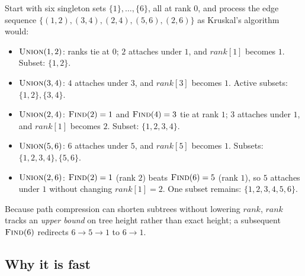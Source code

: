 \begin{algorithm}[H]
\caption{Union-Find with union by rank and path compression}
\DontPrintSemicolon
{}
\end{algorithm}

\begin{labbox}
Start with six singleton sets $\{1\},\dots,\{6\}$, all at rank $0$, and process the edge sequence $\{(1,2),(3,4),(2,4),(5,6),(2,6)\}$ as Kruskal's algorithm would:
\begin{itemize}
\item $\textsc{Union}(1,2)$: ranks tie at $0$; $2$ attaches under $1$, and $\textit{rank}[1]$ becomes $1$. Subset: $\{1,2\}$.
\item $\textsc{Union}(3,4)$: $4$ attaches under $3$, and $\textit{rank}[3]$ becomes $1$. Active subsets: $\{1,2\}, \{3,4\}$.
\item $\textsc{Union}(2,4)$: $\textsc{Find}(2)=1$ and $\textsc{Find}(4)=3$ tie at rank $1$; $3$ attaches under $1$, and $\textit{rank}[1]$ becomes $2$. Subset: $\{1,2,3,4\}$.
\item $\textsc{Union}(5,6)$: $6$ attaches under $5$, and $\textit{rank}[5]$ becomes $1$. Subsets: $\{1,2,3,4\}, \{5,6\}$.
\item $\textsc{Union}(2,6)$: $\textsc{Find}(2)=1$ (rank $2$) beats $\textsc{Find}(6)=5$ (rank $1$), so $5$ attaches under $1$ without changing $\textit{rank}[1]=2$. One subset remains: $\{1,2,3,4,5,6\}$.
\end{itemize}
Because path compression can shorten subtrees without lowering $\textit{rank}$, $\textit{rank}$ tracks an \emph{upper bound} on tree height rather than exact height; a subsequent $\textsc{Find}(6)$ redirects $6 \to 5 \to 1$ to $6 \to 1$.
\end{labbox}

\subsection{Why it is fast}

